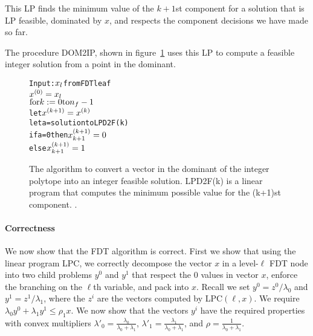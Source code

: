 \documentclass[11pt]{article}
\begin{document}
This LP finds the minimum value of the $k+1$st component for a solution that
is LP feasible, dominated by $x$, and respects the component decisions we have
made so far.

The procedure DOM2IP, shown in figure~\ref{fig:D2I} uses this LP to
compute a feasible integer solution from a point in the dominant.

\begin{figure}[tbh]
{\footnotesize
\begin{center}
\begin{boxedminipage}{3.2in}
\begin{alltt}
Input: \( x\sb{l} \) from FDT leaf
    \( x\sp{(0)} = x\sb{l} \)
    \( \mbox{for} k := 0 \mbox{to} n\sb{f}-1\)
       let \( x\sp{(k+1)} = x\sp{(k)} \)
       let a = solution to LPD2F(k)
       if a = 0 then \( x\sp{(k+1)}\sb{k+1} = 0 \)
       else \( x\sp{(k+1)}\sb{k+1} = 1 \)
\end{alltt}
\end{boxedminipage}
\end{center}
\caption{The algorithm to convert a vector in the dominant of the integer polytope
into an integer feasible solution.  LPD2F(k) is a linear program that computes the minimum
possible value for the (k+1)st component. \label{fig:D2I}.}
}
\end{figure}

\paragraph{Correctness}
We now show that the FDT algorithm is correct.  First we show that
using the linear program LPC, we correctly decompose the vector $x$ in
a level-$\ell$ FDT node into two child problems $y^0$ and $y^1$ that
respect the $0$ values in vector $x$, enforce the branching on the $\ell$th variable, and pack
into $x$.  Recall we set $y^0 = z^0/\lambda_0$ and $y^1 =
z^1/\lambda_1$, where the $z^i$ are the vectors computed by
LPC$(\ell,x)$.  We require $\lambda_{0} y^{0} + \lambda_{1} y^{1} \le
\rho_{1} x.$ We now show that the vectors $y^i$ have the required
properties with convex multipliers $\lambda'_0 =
\frac{\lambda_0}{\lambda_0 + \lambda_1}$, $\lambda'_1 =
\frac{\lambda_1}{\lambda_0 + \lambda_1}$, and $\rho =
\frac{1}{\lambda_0 + \lambda_1}$.
\end{document}
